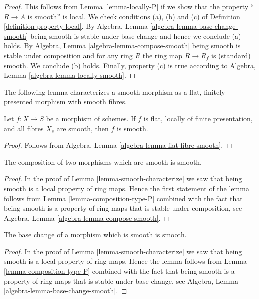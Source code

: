 \begin{proof}
This follows from Lemma \ref{lemma-locally-P} if we show that
the property ``$R \to A$ is smooth'' is local.
We check conditions (a), (b) and (c) of Definition
\ref{definition-property-local}.
By Algebra, Lemma \ref{algebra-lemma-base-change-smooth}
being smooth is stable under base change and hence
we conclude (a) holds. By
Algebra, Lemma \ref{algebra-lemma-compose-smooth}
being smooth is stable under composition and for any ring
$R$ the ring map $R \to R_f$ is (standard) smooth.
We conclude (b) holds. Finally, property (c) is true
according to Algebra, Lemma \ref{algebra-lemma-locally-smooth}.
\end{proof}


\noindent
The following lemma characterizes a smooth morphism as a
flat, finitely presented morphism with smooth fibres.

\begin{lemma}
\label{lemma-smooth-flat-smooth-fibres}
Let $f : X \to S$ be a morphism of schemes.
If $f$ is flat, locally of finite presentation, and all
fibres $X_s$ are smooth, then $f$
is smooth.
\end{lemma}

\begin{proof}
Follows from Algebra, Lemma \ref{algebra-lemma-flat-fibre-smooth}.
\end{proof}

\begin{lemma}
\label{lemma-composition-smooth}
The composition of two morphisms which are smooth is smooth.
\end{lemma}

\begin{proof}
In the proof of Lemma \ref{lemma-smooth-characterize}
we saw that being smooth is a local property of ring maps.
Hence the first statement of the lemma follows from
Lemma \ref{lemma-composition-type-P} combined
with the fact that being smooth is a property of ring maps that is
stable under composition, see
Algebra, Lemma \ref{algebra-lemma-compose-smooth}.
\end{proof}

\begin{lemma}
\label{lemma-base-change-smooth}
The base change of a morphism which is smooth is smooth.
\end{lemma}

\begin{proof}
In the proof of Lemma \ref{lemma-smooth-characterize}
we saw that being smooth is a local property of ring maps.
Hence the lemma follows from
Lemma \ref{lemma-composition-type-P} combined
with the fact that being smooth is a property of ring maps that is
stable under base change, see
Algebra, Lemma \ref{algebra-lemma-base-change-smooth}.
\end{proof}

